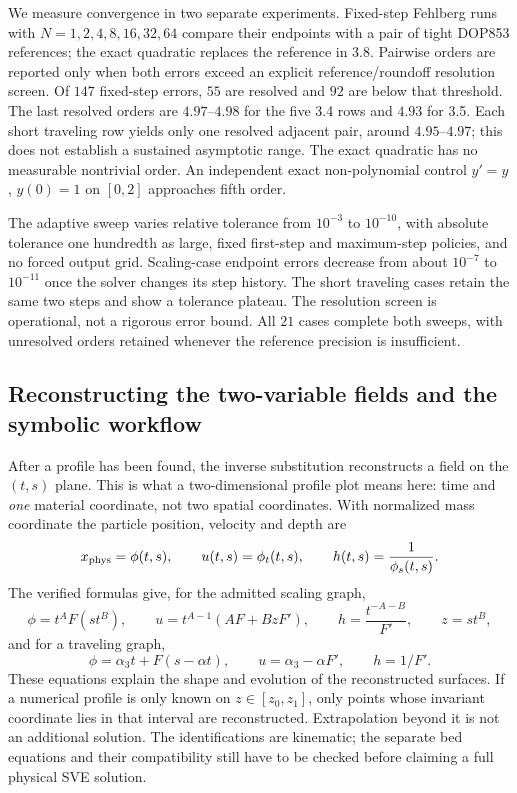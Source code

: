 We measure convergence in two separate experiments.
Fixed-step Fehlberg runs with $N=1,2,4,8,16,32,64$ compare their endpoints
with a pair of tight DOP853 references; the exact quadratic replaces the
reference in 3.8. Pairwise orders are reported only when both errors exceed
an explicit reference/roundoff resolution screen. Of $147$ fixed-step errors,
$55$ are resolved and $92$ are below that threshold. The last resolved orders
are $4.97$--$4.98$ for the five 3.4 rows and $4.93$ for 3.5. Each short
traveling row yields only one resolved adjacent pair, around $4.95$--$4.97$;
this does not establish a sustained asymptotic range. The exact quadratic
has no measurable nontrivial order. An independent exact non-polynomial
control $y'=y$, $y(0)=1$ on $[0,2]$ approaches fifth order.

The adaptive sweep varies relative tolerance from $10^{-3}$ to $10^{-10}$,
with absolute tolerance one hundredth as large, fixed first-step and
maximum-step policies, and no forced output grid. Scaling-case endpoint
errors decrease from about $10^{-7}$ to $10^{-11}$ once the solver changes
its step history. The short traveling cases retain the same two steps and
show a tolerance plateau. The resolution screen is operational, not a
rigorous error bound. All $21$ cases complete both sweeps, with unresolved
orders retained whenever the reference precision is insufficient.


\subsection{Reconstructing the two-variable fields and the symbolic workflow}
After a profile has been found, the inverse substitution reconstructs a
field on the $(t,s)$ plane. This is what a two-dimensional profile plot
means here: time and \emph{one} material coordinate, not two spatial
coordinates. With normalized mass coordinate the particle position,
velocity and depth are
\[
 x_{\rm phys}=\phi(t,s),\qquad u(t,s)=\phi_t(t,s),\qquad
 h(t,s)=\frac1{\phi_s(t,s)}.
\]
The verified formulas give, for the admitted scaling graph,
\[
 \phi=t^AF(st^B),\qquad u=t^{A-1}(AF+BzF'),\qquad
 h=\frac{t^{-A-B}}{F'},\qquad z=st^B,
\]
and for a traveling graph,
\[
 \phi=\alpha_3t+F(s-\alpha t),\qquad
 u=\alpha_3-\alpha F',\qquad h=1/F'.
\]
These equations explain the shape and evolution of the reconstructed
surfaces. If a numerical profile is only known on $z\in[z_0,z_1]$,
only points whose invariant coordinate lies in that interval are
reconstructed. Extrapolation beyond it is not an additional solution.
The identifications are kinematic; the separate bed equations and their
compatibility still have to be checked before claiming a full physical SVE
solution.

